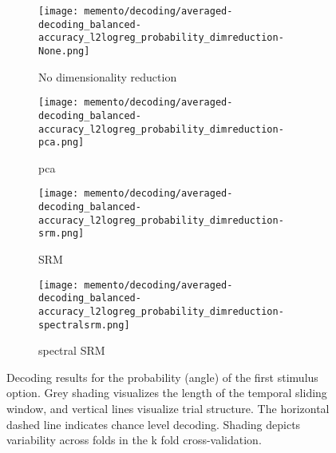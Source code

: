 \begin{figure}
	\centering
	\begin{subfigure}{.49\textwidth}
		\texttt{[image: memento/decoding/averaged-decoding\_balanced-accuracy\_l2logreg\_probability\_dimreduction-None.png]}
		\caption{No dimensionality reduction}
		\label{fig:decoding-probability-none}
	\end{subfigure}
	\begin{subfigure}{0.49\textwidth}
		\texttt{[image: memento/decoding/averaged-decoding\_balanced-accuracy\_l2logreg\_probability\_dimreduction-pca.png]}
		\caption{\gls{pca}}
		\label{fig:decoding-probability-pca}
	\end{subfigure}
	\newline
	\centering
	\begin{subfigure}{0.49\textwidth}
		\texttt{[image: memento/decoding/averaged-decoding\_balanced-accuracy\_l2logreg\_probability\_dimreduction-srm.png]}
		\caption{\gls{SRM}}
		\label{fig:decoding-probability-srm}
	\end{subfigure}
	\begin{subfigure}{0.49\textwidth}
		\texttt{[image: memento/decoding/averaged-decoding\_balanced-accuracy\_l2logreg\_probability\_dimreduction-spectralsrm.png]}
		\caption{spectral \gls{SRM}}
		\label{fig:decoding-probability-spectralsrm}
	\end{subfigure}
	\caption[Decoding results for probability]{Decoding results for the probability (angle) of the first stimulus option. Grey shading visualizes the length of the temporal sliding window, and vertical lines visualize trial structure. The horizontal dashed line indicates chance level decoding. Shading depicts variability across folds in the k fold cross-validation.}
	\label{fig:decoding-probability}
\end{figure}


